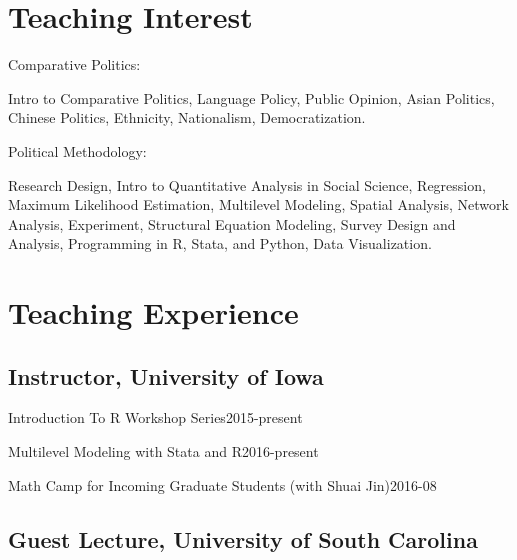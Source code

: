 \documentclass[10.5pt,]{article}
\providecommand{\tightlist}{%
	\setlength{\itemsep}{0pt}\setlength{\parskip}{0pt}}
\renewenvironment{itemize}{
	\begin{list}{}{
			\setlength{\leftmargin}{1.5em}
		}
	}{
	\end{list}
}
\begin{document}
\section{Teaching Interest}\label{teaching-interest}

\begin{itemize}
\tightlist
\item
  Comparative Politics:

  \begin{itemize}
  \tightlist
  \item
    Intro to Comparative Politics, Language Policy, Public Opinion,
    Asian Politics, Chinese Politics, Ethnicity, Nationalism,
    Democratization.
  \end{itemize}
\item
  Political Methodology:

  \begin{itemize}
  \tightlist
  \item
    Research Design, Intro to Quantitative Analysis in Social Science,
    Regression, Maximum Likelihood Estimation, Multilevel Modeling,
    Spatial Analysis, Network Analysis, Experiment, Structural Equation
    Modeling, Survey Design and Analysis, Programming in R, Stata, and
    Python, Data Visualization.
  \end{itemize}
\end{itemize}

\section{Teaching Experience}\label{teaching-experience}

\subsection{Instructor, University of
Iowa}\label{instructor-university-of-iowa}

\begin{itemize}
\tightlist
\item
  Introduction To R Workshop Series\hfill 2015-present
\item
  Multilevel Modeling with Stata and R\hfill 2016-present
\item
  Math Camp for Incoming Graduate Students (with Shuai
  Jin)\hfill 2016-08
\end{itemize}

\subsection{Guest Lecture, University of South
Carolina}\label{guest-lecture-university-of-south-carolina}
\end{document}
